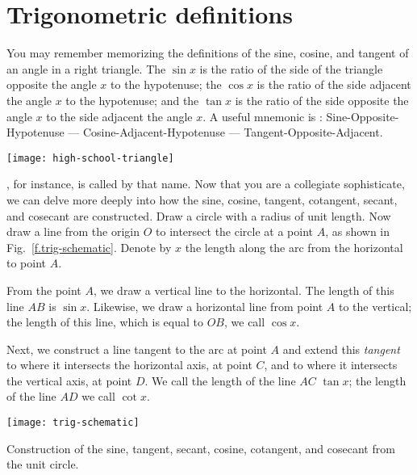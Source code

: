 
\section{Trigonometric definitions}

You may remember memorizing the definitions of the sine, cosine, and tangent of an angle in a right triangle. The $\sin x$ is the ratio of the side of the triangle opposite the angle $x$ to the hypotenuse; the $\cos x$ is the ratio of the side adjacent the angle $x$ to the hypotenuse; and the $\tan x$ is the ratio of the side opposite the angle $x$ to the side adjacent the angle $x$. A useful mnemonic is : Sine-Opposite-Hypotenuse --- Cosine-Adjacent-Hypotenuse --- Tangent-Opposite-Adjacent.

\begin{marginfigure}
\texttt{[image: high-school-triangle]}
\label{f.high-school-triangle}
\end{marginfigure}

, for instance, is called by that name.  Now that you are a  collegiate sophisticate, we can delve more deeply into how the sine, cosine, tangent, cotangent, secant, and cosecant are constructed.
Draw a circle with a radius of unit length.  Now draw a line from the origin $O$ to intersect the circle at a point $A$, as shown in Fig.~\ref{f.trig-schematic}.  Denote by $x$ the length along the arc from the horizontal to point $A$.

From the point $A$, we draw a vertical line to the horizontal.  The length of this line $AB$ is $\sin x$. Likewise, we draw a horizontal line from point $A$ to the vertical; the length of this line, which is equal to $OB$, we call $\cos x$.  

Next, we construct a line tangent to the arc at point $A$ and extend this \emph{tangent} to where it intersects the horizontal axis, at point $C$, and to where it intersects the vertical axis, at point $D$.  We call the length of the line $AC$ $\tan x$; the length of the line $AD$ we call $\cot x$.

\begin{marginfigure}[-6\baselineskip]
\texttt{[image: trig-schematic]}
\caption[Construction from the unit circle]{Construction of the sine, tangent, secant, cosine, cotangent, and cosecant from the unit circle.}
\label{f.trig-schematic}
\end{marginfigure}

